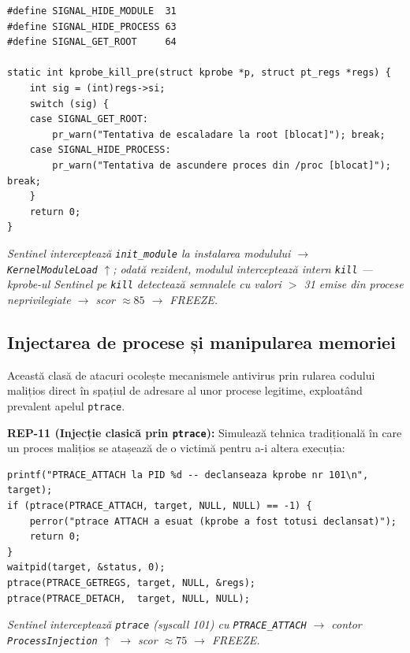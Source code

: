 \begin{lstlisting}[style=cstyle,caption={REP-18: Interceptarea semnalelor UNIX (stil Reptile)}]
#define SIGNAL_HIDE_MODULE  31
#define SIGNAL_HIDE_PROCESS 63
#define SIGNAL_GET_ROOT     64

static int kprobe_kill_pre(struct kprobe *p, struct pt_regs *regs) {
    int sig = (int)regs->si;
    switch (sig) {
    case SIGNAL_GET_ROOT:
        pr_warn("Tentativa de escaladare la root [blocat]"); break;
    case SIGNAL_HIDE_PROCESS:
        pr_warn("Tentativa de ascundere proces din /proc [blocat]"); break;
    }
    return 0;
}
\end{lstlisting}
\par\textit{Sentinel interceptează \texttt{init\_module} la instalarea modulului $\rightarrow$ \texttt{KernelModuleLoad} $\uparrow$; odată rezident, modulul interceptează intern \texttt{kill} --- kprobe-ul Sentinel pe \texttt{kill} detectează semnalele cu valori $>$ 31 emise din procese neprivilegiate $\rightarrow$ scor $\approx 85$ $\rightarrow$ FREEZE.}

\subsection{Injectarea de procese și manipularea memoriei}
\label{subsec:attack_injection}

\par Această clasă de atacuri ocolește mecanismele antivirus prin rularea codului malițios direct în spațiul de adresare al unor procese legitime, exploatând prevalent apelul \texttt{ptrace}.

\par \textbf{REP-11 (Injecție clasică prin \texttt{ptrace}):} Simulează tehnica tradițională în care un proces malițios se atașează de o victimă pentru a-i altera execuția:

\begin{lstlisting}[style=cstyle,caption={REP-11: Atașarea la un proces vizat prin ptrace}]
printf("PTRACE_ATTACH la PID %d -- declanseaza kprobe nr 101\n", target);
if (ptrace(PTRACE_ATTACH, target, NULL, NULL) == -1) {
    perror("ptrace ATTACH a esuat (kprobe a fost totusi declansat)");
    return 0;
}
waitpid(target, &status, 0);
ptrace(PTRACE_GETREGS, target, NULL, &regs);
ptrace(PTRACE_DETACH,  target, NULL, NULL);
\end{lstlisting}
\par\textit{Sentinel interceptează \texttt{ptrace} (syscall 101) cu \texttt{PTRACE\_ATTACH} $\rightarrow$ contor \texttt{ProcessInjection} $\uparrow$ $\rightarrow$ scor $\approx 75$ $\rightarrow$ FREEZE.}

